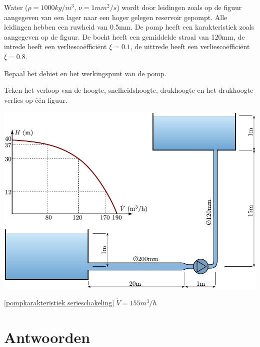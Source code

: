 \begin{toepassing}[*]
	\label{pompkarakteristiek serieschakeling}
Water ($\rho=1000\unit{kg/m^3}$, $\nu=1\unit{mm^2/s}$) wordt door leidingen zoals op de figuur aangegeven van een lager naar een hoger gelegen reservoir gepompt. Alle leidingen hebben een ruwheid van 0.5mm. De pomp heeft een karakteristiek zoals aangegeven op de figuur. De bocht heeft een gemiddelde straal van 120mm, de intrede heeft een verliescoëfficiënt $\xi = 0.1$, de uittrede heeft een verliescoëfficiënt $\xi = 0.8$.
		
Bepaal het debiet en het werkingspunt van de pomp.
		
Teken het verloop van de hoogte, snelheidshoogte, drukhoogte en het drukhoogte verlies op één figuur.

	\centering
	\includegraphics{fig/stroming_in_leidingen/pompopvoerhoogte}
\end{toepassing}
\begin{antwoord}{\ref{pompkarakteristiek serieschakeling}}
	$\dot{V} = 155\unit{m^3/h}$
\end{antwoord}
\section*{Antwoorden}
	\begin{multicols}{2}
	\end{multicols}